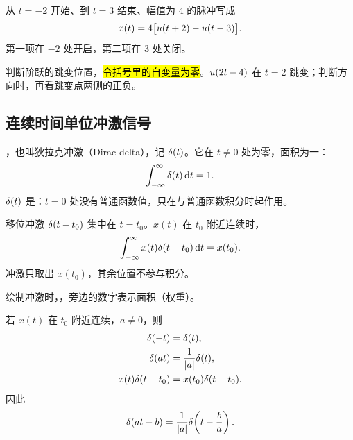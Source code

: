\begin{example}[用阶跃信号表示有限时宽脉冲]
  从 $t=-2$ 开始、到 $t=3$ 结束、幅值为 $4$ 的脉冲写成
  \[
    x(t)=4\bigl[u(t+2)-u(t-3)\bigr].
  \]
  第一项在 $-2$ 处开启，第二项在 $3$ 处关闭。
\end{example}

判断阶跃的跳变位置，\hl{令括号里的自变量为零}。$u(2t-4)$ 在 $t=2$ 跳变；判断方向时，再看跳变点两侧的正负。

\subsection{连续时间单位冲激信号}

\begin{definition}[单位冲激信号]
  \label{def:ct-unit-impulse}
  ，也叫狄拉克冲激（Dirac delta），记 $\delta(t)$。它在 $t\ne0$ 处为零，面积为一：
  \begin{equation}
    \int_{-\infty}^{\infty}\delta(t)\mathop{}\!\mathrm{d} t=1.
    \label{eq:unit-area-impulse}
  \end{equation}
  $\delta(t)$ 是：$t=0$ 处没有普通函数值，只在与普通函数积分时起作用。
\end{definition}

移位冲激 $\delta(t-t_0)$ 集中在 $t=t_0$。$x(t)$ 在 $t_0$ 附近连续时，
\begin{equation}
  \int_{-\infty}^{\infty}
    x(t)\delta(t-t_0)\mathop{}\!\mathrm{d} t=x(t_0).
  \label{eq:ct-impulse-sifting}
\end{equation}
冲激只取出 $x(t_0)$，其余位置不参与积分。

绘制冲激时，，旁边的数字表示面积（权重）。

\begin{definition}[冲激的常用性质]
  若 $x(t)$ 在 $t_0$ 附近连续，$a\ne0$，则
  \begin{align}
    \delta(-t)&=\delta(t),
    \label{eq:impulse-even}\\
    \delta(at)&=\frac{1}{|a|}\delta(t),
    \label{eq:impulse-scaling}\\
    x(t)\delta(t-t_0)&=x(t_0)\delta(t-t_0).
    \label{eq:impulse-multiplication}
  \end{align}
  因此
  \begin{equation}
    \delta(at-b)
    =\frac{1}{|a|}\delta\!\left(t-\frac{b}{a}\right).
    \label{eq:shifted-scaled-impulse}
  \end{equation}
\end{definition}

